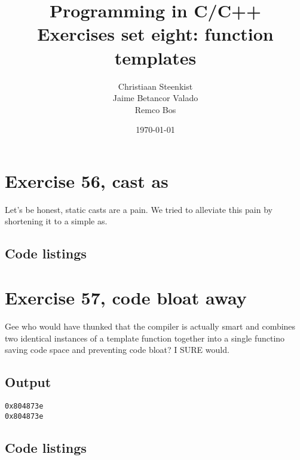 \documentclass[11pt]{article}
\begin{document}
\title{Programming in C/C++ \\
       Exercises set eight: function templates
}
\date{\today}
\author{Christiaan Steenkist \\
Jaime Betancor Valado \\
Remco Bos \\
}

\maketitle
\section*{Exercise 56, cast as}
Let's be honest, static casts are a pain.
We tried to alleviate this pain by shortening it to a simple as.

\subsection*{Code listings}




\section*{Exercise 57, code bloat away}
Gee who would have thunked that the compiler is actually smart and combines two identical instances of a template function together into a single functino saving code space and preventing code bloat? I SURE would.

\subsection*{Output}
\begin{lstlisting}
0x804873e
0x804873e
\end{lstlisting}

\subsection*{Code listings}






\end{document}
